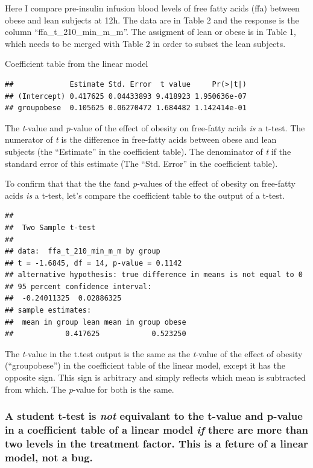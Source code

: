 \documentclass[]{book}
\begin{document}
Here I compare pre-insulin infusion blood levels of free fatty acids
(ffa) between obese and lean subjects at 12h. The data are in Table 2
and the response is the column ``ffa\_t\_210\_min\_m\_m''. The assigment
of lean or obese is in Table 1, which needs to be merged with Table 2 in
order to subset the lean subjects.

Coefficient table from the linear model

\begin{verbatim}
##             Estimate Std. Error  t value     Pr(>|t|)
## (Intercept) 0.417625 0.04433893 9.418923 1.950636e-07
## groupobese  0.105625 0.06270472 1.684482 1.142414e-01
\end{verbatim}

The \emph{t}-value and \emph{p}-value of the effect of obesity on
free-fatty acids \emph{is} a t-test. The numerator of \emph{t} is the
difference in free-fatty acids between obese and lean subjects (the
``Estimate'' in the coefficient table). The denominator of \emph{t} if
the standard error of this estimate (The ``Std. Error'' in the
coefficient table).

To confirm that that the the \emph{t}and \emph{p}-values of the effect
of obesity on free-fatty acids \emph{is} a t-test, let's compare the
coefficient table to the output of a t-test.

\begin{verbatim}
## 
##  Two Sample t-test
## 
## data:  ffa_t_210_min_m_m by group
## t = -1.6845, df = 14, p-value = 0.1142
## alternative hypothesis: true difference in means is not equal to 0
## 95 percent confidence interval:
##  -0.24011325  0.02886325
## sample estimates:
##  mean in group lean mean in group obese 
##            0.417625            0.523250
\end{verbatim}

The \emph{t}-value in the t.test output is the same as the
\emph{t}-value of the effect of obesity (``groupobese'') in the
coefficient table of the linear model, except it has the opposite sign.
This sign is arbitrary and simply reflects which mean is subtracted from
which. The \emph{p}-value for both is the same.

\subsubsection{\texorpdfstring{A student t-test is \emph{not} equivalant
to the t-value and p-value in a coefficient table of a linear model
\emph{if} there are more than two levels in the treatment factor. This
is a feture of a linear model, not a
bug.}{A student t-test is not equivalant to the t-value and p-value in a coefficient table of a linear model if there are more than two levels in the treatment factor. This is a feture of a linear model, not a bug.}}\label{a-student-t-test-is-not-equivalant-to-the-t-value-and-p-value-in-a-coefficient-table-of-a-linear-model-if-there-are-more-than-two-levels-in-the-treatment-factor.-this-is-a-feture-of-a-linear-model-not-a-bug.}
\end{document}
